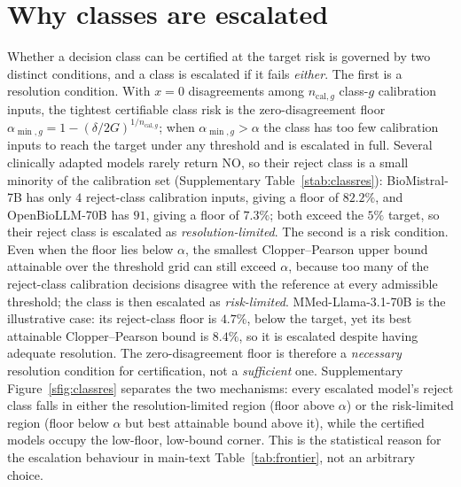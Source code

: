 \documentclass[11pt]{article}
\theoremstyle{plain}
\newcommand{\NO}{\mathrm{NO}}
\begin{document}
\section{Why classes are escalated}
Whether a decision class can be certified at the target risk is governed by two distinct conditions,
and a class is escalated if it fails \emph{either}. The first is a resolution condition. With $x=0$
disagreements among $n_{\mathrm{cal},g}$ class-$g$ calibration inputs, the tightest certifiable class
risk is the zero-disagreement floor $\alpha_{\min,g}=1-(\delta/2G)^{1/n_{\mathrm{cal},g}}$; when
$\alpha_{\min,g}>\alpha$ the class has too few calibration inputs to reach the target under any
threshold and is escalated in full. Several clinically adapted models rarely return $\NO$, so their
reject class is a small minority of the calibration set (Supplementary Table~\ref{stab:classres}):
BioMistral-7B has only $4$ reject-class calibration inputs, giving a floor of $82.2\%$, and
OpenBioLLM-70B has $91$, giving a floor of $7.3\%$; both exceed the $5\%$ target, so their reject class
is escalated as \emph{resolution-limited}. The second is a risk condition. Even when the floor lies
below $\alpha$, the smallest Clopper--Pearson upper bound attainable over the threshold grid can still
exceed $\alpha$, because too many of the reject-class calibration decisions disagree with the reference
at every admissible threshold; the class is then escalated as \emph{risk-limited}.
MMed-Llama-3.1-70B is the illustrative case: its reject-class floor is $4.7\%$, below the target, yet
its best attainable Clopper--Pearson bound is $8.4\%$, so it is escalated despite having adequate
resolution. The zero-disagreement floor is therefore a \emph{necessary} resolution condition for
certification, not a \emph{sufficient} one. Supplementary Figure~\ref{sfig:classres} separates the two
mechanisms: every escalated model's reject class falls in either the resolution-limited region (floor
above $\alpha$) or the risk-limited region (floor below $\alpha$ but best attainable bound above it),
while the certified models occupy the low-floor, low-bound corner. This is the statistical reason for
the escalation behaviour in main-text Table~\ref{tab:frontier}, not an arbitrary choice.

\begin{center}\end{center}
\end{document}
